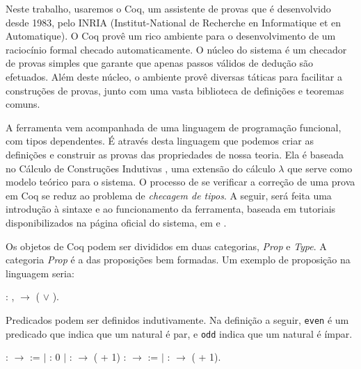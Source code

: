 Neste trabalho, usaremos o Coq, um assistente de provas que é desenvolvido desde
1983, pelo INRIA (Institut-National de Recherche en Informatique et en
Automatique). O Coq provê um rico ambiente para o desenvolvimento de um
raciocínio formal checado automaticamente. O núcleo do sistema é um checador de
provas simples que garante que apenas passos válidos de dedução são efetuados.
Além deste núcleo, o ambiente provê diversas táticas para facilitar a
construções de provas, junto com uma vasta biblioteca de definições e teoremas
comuns.

A ferramenta vem acompanhada de uma linguagem de programação funcional, com
tipos dependentes. É através desta linguagem que podemos criar as definições e
construir as provas das propriedades de nossa teoria. Ela é baseada no Cálculo
de Construções Indutivas \cite{coquand}, uma extensão do cálculo $\lambda$ que
serve como modelo teórico para o sistema. O processo de se verificar a correção
de uma prova em Coq se reduz ao problema de \emph{checagem de tipos}. A seguir,
será feita uma introdução à sintaxe e ao funcionamento da ferramenta, baseada em
tutoriais disponibilizados na página oficial do sistema, em \cite{coq} e
\cite{coq2}.


Os objetos de Coq podem ser divididos em duas categorias, \emph{Prop} e
\emph{Type}. A categoria \emph{Prop} é a das proposições bem formadas. Um
exemplo de proposição na linguagem seria:

\bigskip
\coqdockw{\ensuremath{\forall}}   : ,
 \ensuremath{\rightarrow} ( \ensuremath{\lor}
).\coqdoceol
\bigskip

Predicados podem ser definidos indutivamente. Na definição a seguir,
\texttt{even} é um predicado que indica que um natural é par, e \texttt{odd}
indica que um natural é ímpar.

\bigskip {}  : 
\ensuremath{\rightarrow}  :=\coqdoceol 
\coqdocindent{2.00em}\ensuremath{|}  :  0\coqdoceol
\coqdocindent{2.00em}\ensuremath{|}   :
  \ensuremath{\rightarrow} 
( + 1)\coqdoceol {}  :
 \ensuremath{\rightarrow}  :=\coqdoceol
\coqdocindent{2.00em}\ensuremath{|}   :
  \ensuremath{\rightarrow} 
( + 1).\coqdoceol \bigskip

